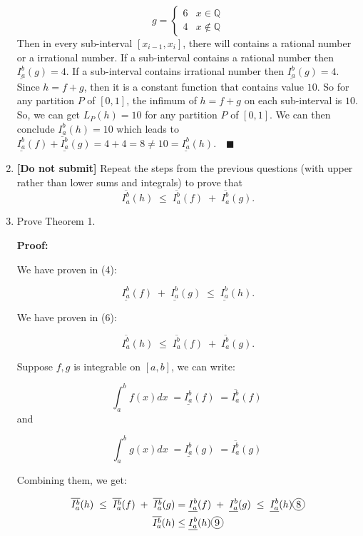 \documentclass[12pt]{exam}
\newcommand*\circled[1]{\tikz[baseline=(char.base)]{
    \node[shape=circle, draw, inner sep=1pt, 
        minimum height=12pt] (char) {#1};}}
\newcommand{\Q}{\mathbb{Q}}
\begin{document}
\begin{enumerate}
	\[
	    g = 
	    \begin{cases}
	        6 & x \in \Q \\
	        4 & x \notin \Q
	    \end{cases}
	\]
	Then in every sub-interval $[x_{i-1},x_i]$, there will contains a rational number or a irrational number. If a sub-interval contains a rational number then $\underline{I_a^b}(g)=4$. If a sub-interval contains irrational number then $\underline{I_a^b}(g)=4$. Since $h=f+g$, then it is a constant function that contains value $10$. So for any partition $P$ of $[0,1]$, the infimum of $h=f+g$ on each sub-interval is $10$. So, we can get $L_P(h)=10$ for any partition $P$ of $[0,1]$. We can then conclude $\underline{I_a^b}(h)=10$ which leads to $\underline{I_a^b}(f)+\underline{I_a^b}(g)=4+4=8\neq10=\underline{I_a^b}(h).\quad\blacksquare$
	
\item {\bf [Do not submit]}  Repeat the steps from the previous questions (with upper rather than lower sums and integrals) to prove that
	$$
		\overline{I_a^b}(h) \; \leq \; \overline{I_a^b}(f) \; + \; \overline{I_a^b}(g).
	$$

\item Prove Theorem 1.

\textbf{Proof:}

We have proven in (4):

$$
	\underline{I_a^b}(f) \; + \; \underline{I_a^b}(g) \; \leq \;  \underline{I_a^b}(h).
$$

We have proven in (6):

$$
    \overline{I_a^b}(h) \; \leq \; \overline{I_a^b}(f) \; + \; \overline{I_a^b}(g).
$$

Suppose $f, g$ is integrable on $[a,b]$, we can write:

$$
     \int_a^b f(x) dx \; = \underline{I_a^b}(f) \; = \overline{I_a^b}(f) \;
$$
and

$$
    \int_a^b g(x) dx \; = \underline{I_a^b}(g) \; = \overline{I_a^b}(g) \;
$$

Combining them, we get:

\begin{align*}
    \overline{I_a^b}(h) \; \leq \; \overline{I_a^b}(f) \; + \; \overline{I_a^b}(g) &= \underline{I_a^b}(f) \; + \; \underline{I_a^b}(g) \; \leq \;  \underline{I_a^b}(h) \circled{8} \\ 
    \overline{I_a^b}(h) &\leq \underline{I_a^b}(h) \circled{9}
\end{align*}


\end{enumerate}
\end{document}
